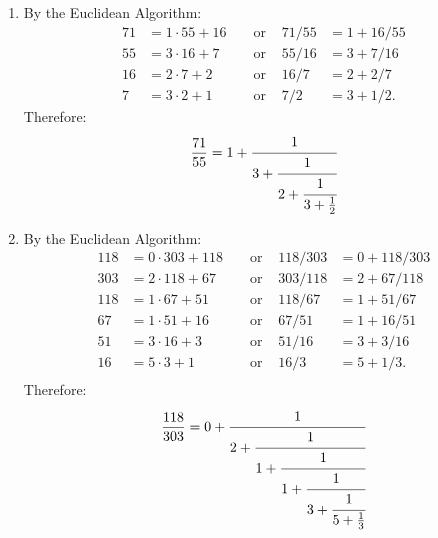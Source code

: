 \begin{solution}
\begin{enumerate}
\begin{align*}
            7 &= 3\cdot 2 + 1 & &\text{ or } & 7/2 &= 3 + 1/2.
        \end{align*}
        Therefore:
        $$\frac{187}{57} =
        3 + \cfrac{1}{
            3 + \cfrac{1}{
                1 + \cfrac{1}{
                    1 + \cfrac{1}{
                        3 + \frac{1}{
                            2
                            }
                        }
                    }
                }
            }$$
        \item By the Euclidean Algorithm:
        \begin{align*}
            71 &= 1\cdot 55 + 16 & &\text{ or } & 71/55 &= 1 + 16/55 \\
            55 &= 3\cdot 16 + 7 & &\text{ or } & 55/16 &= 3 + 7/16 \\
            16 &= 2\cdot 7 + 2 & &\text{ or } & 16/7 &= 2 + 2/7 \\
            7 &= 3\cdot 2 + 1 & &\text{ or } & 7/2 &= 3 + 1/2.
        \end{align*}
        Therefore:
        $$\frac{71}{55} =
        1 + \cfrac{1}{
            3 + \cfrac{1}{
                2 + \cfrac{1}{
                    3 + \frac{1}{
                        2
                        }
                    }
                }
            }$$
        \item By the Euclidean Algorithm:
        \begin{align*}
            118 &= 0\cdot 303 + 118 & &\text{ or } & 118/303 &= 0 + 118/303 \\
            303 &= 2\cdot 118 + 67 & &\text{ or } & 303/118 &= 2 + 67/118 \\
            118 &= 1\cdot 67 + 51 & &\text{ or } & 118/67 &= 1 + 51/67 \\
            67 &= 1\cdot 51 + 16 & &\text{ or } & 67/51 &= 1 + 16/51 \\
            51 &= 3\cdot 16 + 3 & &\text{ or } & 51/16 &= 3 + 3/16 \\
            16 &= 5\cdot 3 + 1 & &\text{ or } & 16/3 &= 5 + 1/3. \\
        \end{align*}
        Therefore:
        $$\frac{118}{303} = 
        0 + \cfrac{1}{
            2 + \cfrac{1}{
                1 + \cfrac{1}{
                    1 + \cfrac{1}{
                        3 + \cfrac{1}{
                            5 + \frac{1}{
                                3
                                }
                            }
                        }
                    }
                }
            }$$ \\
    \end{enumerate}
\end{solution}


